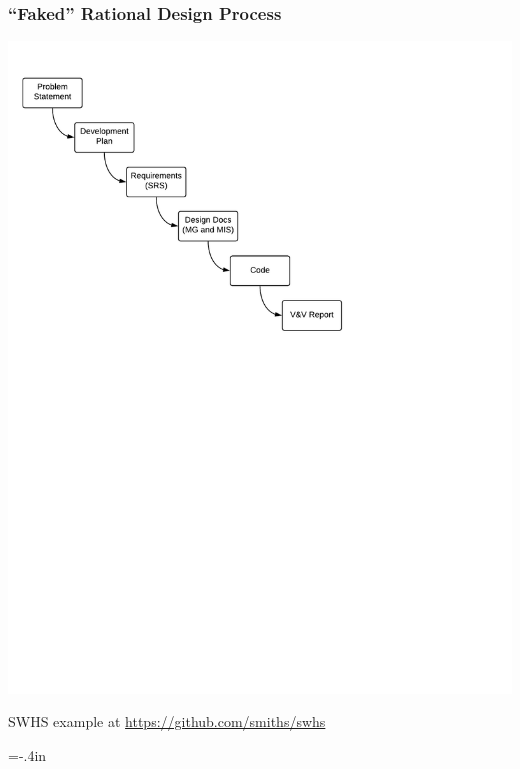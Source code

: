 \documentclass{beamer}
\begin{document}

\begin{frame}

\frametitle{``Faked'' Rational Design Process}

\begin{center}
\includegraphics[scale=0.6]{Waterfall.pdf}
\end{center}

SWHS example at
\href{https://github.com/smiths/swhs}{https://github.com/smiths/swhs}

\end{frame}


\hoffset=-.4in %
\end{document}
